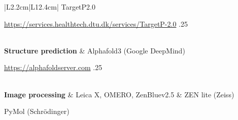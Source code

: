 \begin{table}[H]
\begin{threeparttable}
\begin{tabular}{|L{2.2cm}|L{12.4cm}|}
                                                 TargetP2.0\textbf{}  \hfill
            \begin{small}\url{https://services.healthtech.dtu.dk/services/TargetP-2.0} .25\end{small}  \\
            \textbf{Structure prediction} & Alphafold3\textbf{} \space (Google DeepMind) \hfill
            \begin{small}\url{https://alphafoldserver.com} .25\end{small} \\
            \textbf{Image processing} & Leica X, OMERO, ZenBluev2.5 \& ZEN lite (Zeiss)\par
                                        PyMol (Schrödinger)  \\
            \hline
        \end{tabular}  
    \begin{tablenotes}\small 
    \item[a] \cite{powell_phyre22_2025}
    \item[b] \cite{walker_protein_2005} 
    \item[c] \cite{gautier_heliquest_2008} 
    \item[d] \cite{odum_deeploc_2024}
    \item[e] \cite{teufel_signalp_2022}
    \item[f] \cite{armenteros_detecting_2019}
    \item[g] \cite{abramson_accurate_2024}
    \end{tablenotes}
\end{threeparttable}
\end{table}
